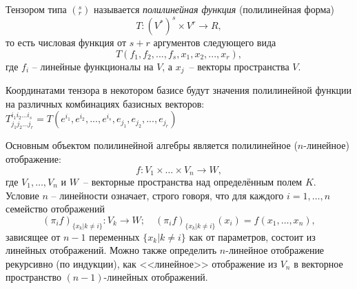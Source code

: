 
\begin{definition}
	Тензором типа $(^s _r)$ называется \textit{полилинейная функция} (полилинейная форма) $$T \colon  (V^*)^s \times V^r\to R,$$ то есть числовая функция от $s+r$ аргументов следующего вида $$T(f_1,f_2,...,f_s,x_1,x_2,...,x_r),$$ где $f_i$ -- линейные функционалы на $V$, а $x_j$ -- векторы пространства $V$.
	
	Координатами тензора в некотором базисе будут значения полилинейной функции на различных комбинациях базисных векторов: $T^{i_1i_2...i_s}_{j_1j_2...j_r}=T(e^{i_1},e^{i_2},...,e^{i_s},e_{j_1},e_{j_2},...,e_{j_r})$
\end{definition}
{\small
\begin{remark}
	
  Основным объектом полилинейной алгебры является полилинейное ($n$-линейное)
  отображение:
	 $$f : V_1 \times \dots \times V_n \rightarrow W,$$
  где $V_1, \dots, V_n$ и $W$ -- векторные пространства над определённым полем
  $K$. Условие $n$ -- линейности означает, строго говоря, что для каждого $i =
  1, \dots, n$ семейство отображений
	$$(\pi_if)_{\{x_k | k \ne i\}} : V_k \rightarrow W; \quad 
	(\pi_if)_{\{x_k | k \ne i\}}(x_i) = f(x_1, \dots, x_n),$$
  зависящее от $n - 1$ переменных $\{x_k | k \ne i\}$ как от параметров, состоит
  из линейных отображений. Можно также определить $n$-линейное отображение
  рекурсивно (по индукции), как <<линейное>> отображение из $V_n$ в векторное
  пространство $(n - 1)$-линейных отображений.
\end{remark}
}


